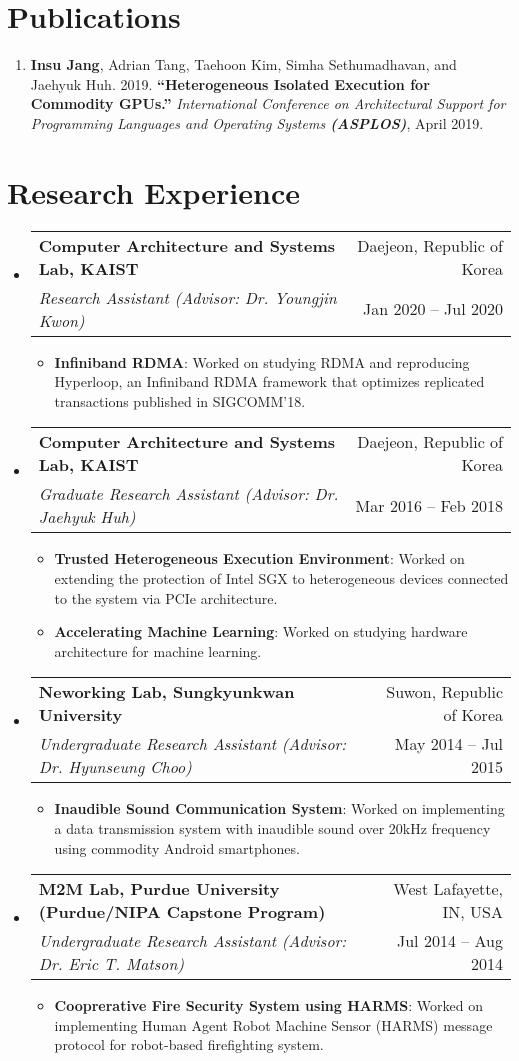 \documentclass[letterpaper,oneside,11pt]{article}
\makeatletter
\newcommand{\resumeItem}[2]{
  \item\small{
    \textbf{#1}{: #2 \vspace{-2pt}}
  }
}
\newcommand{\resumeSubheading}[4]{
  \vspace{-1pt}\item
    \begin{tabular*}{0.97\textwidth}[t]{l@{\extracolsep{\fill}}r}
      \textbf{#1} & #2 \\
      \textit{\small#3} & \small #4 \\
    \end{tabular*}\vspace{-6pt}
}
\newcommand{\resumeSubHeadingListStart}{\begin{itemize}[leftmargin=*]}
\newcommand{\resumeSubHeadingListEnd}{\end{itemize}}
\newcommand{\resumeItemListStart}{\begin{itemize}}
\newcommand{\resumeItemListEnd}{\end{itemize}\vspace{-5pt}}
\makeatother
\begin{document}
\section{Publications}
\begin{enumerate}[leftmargin=*]
  \item \small \textbf{Insu Jang}, Adrian Tang, Taehoon Kim, Simha Sethumadhavan, and Jaehyuk Huh. 2019. \textbf{``Heterogeneous Isolated Execution for Commodity GPUs.''} \textit{International Conference on Architectural Support for Programming Languages and Operating Systems \textbf{(ASPLOS)}}, April 2019.
\end{enumerate}

\section{Research Experience}
  \resumeSubHeadingListStart
    \resumeSubheading
      {Computer Architecture and Systems Lab, KAIST}{Daejeon, Republic of Korea}
      {Research Assistant (Advisor: Dr. Youngjin Kwon)}{Jan 2020 -- Jul 2020}
      \resumeItemListStart
        \resumeItem{Infiniband RDMA}
          {Worked on studying RDMA and reproducing Hyperloop, an Infiniband RDMA framework that optimizes replicated transactions published in SIGCOMM'18.}
      \resumeItemListEnd
    \resumeSubheading
      {Computer Architecture and Systems Lab, KAIST}{Daejeon, Republic of Korea}
      {Graduate Research Assistant (Advisor: Dr. Jaehyuk Huh)}{Mar 2016 -- Feb 2018}
      \resumeItemListStart
        \resumeItem{Trusted Heterogeneous Execution Environment}
          {Worked on extending the protection of Intel SGX to heterogeneous devices connected to the system via PCIe architecture.}
        \resumeItem{Accelerating Machine Learning}
          {Worked on studying hardware architecture for machine learning.}
      \resumeItemListEnd
    \resumeSubheading{Neworking Lab, Sungkyunkwan University}{Suwon, Republic of Korea}
      {Undergraduate Research Assistant (Advisor: Dr. Hyunseung Choo)}{May 2014 -- Jul 2015}
      \resumeItemListStart
        \resumeItem{Inaudible Sound Communication System}
          {Worked on implementing a data transmission system with inaudible sound over 20kHz frequency using commodity Android smartphones.}
      \resumeItemListEnd
    \resumeSubheading{M2M Lab, Purdue University \footnotesize{(Purdue/NIPA Capstone Program)}}{West Lafayette, IN, USA}
      {Undergraduate Research Assistant (Advisor: Dr. Eric T. Matson)}{Jul 2014 -- Aug 2014}
      \resumeItemListStart
        \resumeItem{Cooprerative Fire Security System using HARMS}
          {Worked on implementing Human Agent Robot Machine Sensor (HARMS) message protocol for robot-based firefighting system.}
      \resumeItemListEnd
  \resumeSubHeadingListEnd
\end{document}
